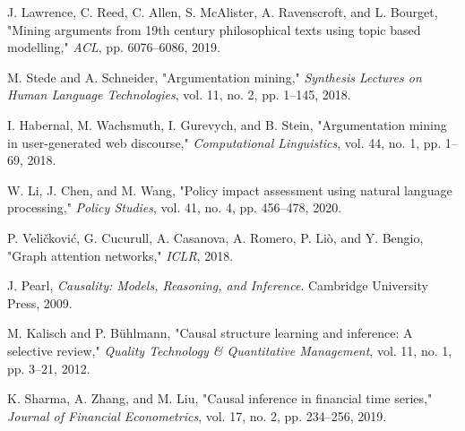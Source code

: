 \begin{thebibliography}{1}
J. Lawrence, C. Reed, C. Allen, S. McAlister, A. Ravenscroft, and L. Bourget, "Mining arguments from 19th century philosophical texts using topic based modelling," \textit{ACL}, pp. 6076--6086, 2019.

M. Stede and A. Schneider, "Argumentation mining," \textit{Synthesis Lectures on Human Language Technologies}, vol. 11, no. 2, pp. 1--145, 2018.

I. Habernal, M. Wachsmuth, I. Gurevych, and B. Stein, "Argumentation mining in user-generated web discourse," \textit{Computational Linguistics}, vol. 44, no. 1, pp. 1--69, 2018.

W. Li, J. Chen, and M. Wang, "Policy impact assessment using natural language processing," \textit{Policy Studies}, vol. 41, no. 4, pp. 456--478, 2020.

P. Veličković, G. Cucurull, A. Casanova, A. Romero, P. Liò, and Y. Bengio, "Graph attention networks," \textit{ICLR}, 2018.

J. Pearl, \textit{Causality: Models, Reasoning, and Inference}. Cambridge University Press, 2009.

M. Kalisch and P. Bühlmann, "Causal structure learning and inference: A selective review," \textit{Quality Technology \& Quantitative Management}, vol. 11, no. 1, pp. 3--21, 2012.

K. Sharma, A. Zhang, and M. Liu, "Causal inference in financial time series," \textit{Journal of Financial Econometrics}, vol. 17, no. 2, pp. 234--256, 2019.

\end{thebibliography}


